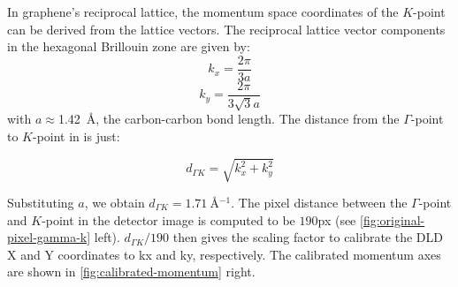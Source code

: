 In graphene's reciprocal lattice, the momentum space coordinates of the $K$-point can be derived from the lattice vectors. The reciprocal lattice vector components in the hexagonal Brillouin zone are given by:
\begin{equation*}
    k_x = \frac{2\pi}{3a}
\end{equation*}
\begin{equation*}
    k_y = \frac{2\pi}{3\sqrt{3}a}
\end{equation*}
with $a\approx$\qty{1.42}{\angstrom}, the carbon-carbon bond length. The distance from the $\Gamma$-point to $K$-point in is just:

\begin{equation*}
    d_{\Gamma K} = \sqrt{k_x^2 + k_y^2}
\end{equation*}

Substituting $a$, we obtain $d_{\Gamma K} = \qty{1.71}{\angstrom^{-1}}$. The pixel distance between the $\Gamma$-point and $K$-point in the detector image is computed to be $190$px (see \cref{fig:original-pixel-gamma-k} left). $d_{\Gamma K}/190$ then gives the scaling factor to calibrate the \gls{DLD} X and Y coordinates to \gls{kx} and \gls{ky}, respectively. The calibrated momentum axes are shown in \cref{fig:calibrated-momentum} right.



